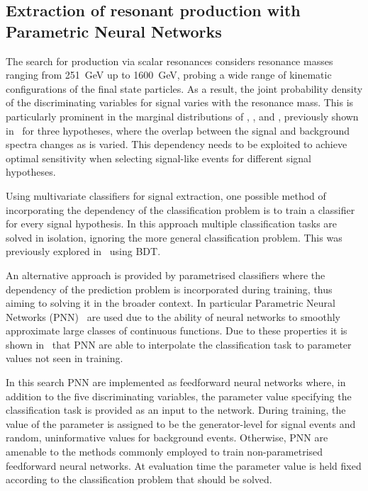 \subsection{Extraction of resonant \HH production with Parametric
  Neural Networks}
\label{sec:mva_pnn}

The search for \HH production via scalar resonances considers
resonance masses ranging from \SI{251}{\GeV} up to \SI{1600}{\GeV},
probing a wide range of kinematic configurations of the final state
particles. As a result, the joint probability density of the
discriminating variables for signal varies with the resonance
mass. This is particularly prominent in the marginal distributions of
\mHH, \dRtautau, and \dRbb, previously shown in~
for three \mX hypotheses, where the overlap between the signal and
background spectra changes as \mX is varied. This dependency needs to
be exploited to achieve optimal sensitivity when selecting signal-like
events for different signal hypotheses.

Using multivariate classifiers for signal extraction, one possible
method of incorporating the \mX dependency of the classification
problem is to train a classifier for every signal hypothesis. In this
approach multiple classification tasks are solved in isolation,
ignoring the more general classification problem. This was previously
explored in~\cite{HIGG-2016-16-witherratum} using BDT.

An alternative approach is provided by parametrised classifiers where
the dependency of the prediction problem is incorporated during
training, thus aiming to solving it in the broader context. In
particular Parametric Neural Networks (PNN)~\cite{Baldi:2016fzo} are
used due to the ability of neural networks to smoothly approximate
large classes of continuous functions. Due to these properties it is
shown in~\cite{Baldi:2016fzo} that PNN are able to interpolate the
classification task to parameter values not seen in training.

In this search PNN are implemented as feedforward neural networks
where, in addition to the five discriminating variables, the parameter
value specifying the classification task is provided as an input to
the network. During training, the value of the parameter is assigned
to be the generator-level \mX for signal events and random,
uninformative values for background events. Otherwise, PNN are
amenable to the methods commonly employed to train non-parametrised
feedforward neural networks. At evaluation time the parameter value is
held fixed according to the classification problem that should be
solved.



